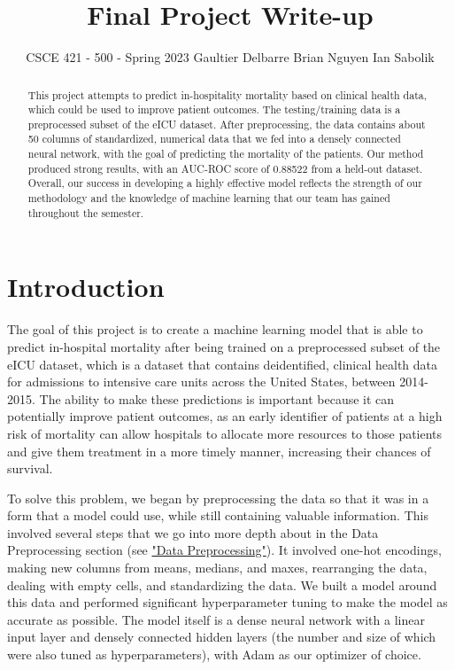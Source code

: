 \documentclass{article}
\title{Final Project Write-up}
\author{CSCE 421 - 500 - Spring 2023 \AND Gaultier Delbarre \And Brian Nguyen \And Ian Sabolik}
\begin{document}
\maketitle{}
\begin{abstract}

  This project attempts to predict in-hospitality mortality based on clinical health data, which could be used to improve patient outcomes. The testing/training data is a preprocessed subset of the eICU dataset. After preprocessing, the data contains about 50 columns of standardized, numerical data that we fed into a densely connected neural network, with the goal of predicting the mortality of the patients. Our method produced strong results, with an AUC-ROC score of 0.88522 from a held-out dataset. Overall, our success in developing a highly effective model reflects the strength of our methodology and the knowledge of machine learning that our team has gained throughout the semester.
  
\end{abstract}


\section{Introduction}
The goal of this project is to create a machine learning model that is able to predict in-hospital mortality after being trained on a preprocessed subset of the eICU dataset, which is a dataset that contains deidentified, clinical health data for admissions to intensive care units across the United States, between 2014-2015.  The ability to make these predictions is important because it can potentially improve patient outcomes, as an early identifier of patients at a high risk of mortality can allow hospitals to allocate more resources to those patients and give them treatment in a more timely manner, increasing their chances of survival.

To solve this problem, we began by preprocessing the data so that it was in a form that a model could use, while still containing valuable information. This involved several steps that we go into more depth about in the Data Preprocessing section (see \hyperref[sssec:preproc]{"Data Preprocessing"}). It involved one-hot encodings, making new columns from means, medians, and maxes, rearranging the data, dealing with empty cells, and standardizing the data. We built a model around this data and performed significant hyperparameter tuning to make the model as accurate as possible. The model itself is a dense neural network with a linear input layer and densely connected hidden layers (the number and size of which were also tuned as hyperparameters), with Adam as our optimizer of choice.
\end{document}
